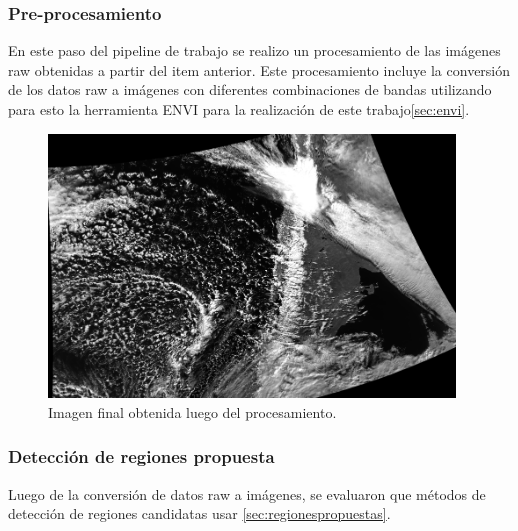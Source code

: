 \subsubsection*{Pre-procesamiento}
En este paso del pipeline de trabajo se realizo un procesamiento de las imágenes raw obtenidas a partir del item anterior. Este procesamiento incluye la conversión de los datos raw a imágenes con diferentes combinaciones de bandas utilizando para esto la herramienta ENVI para la realización de este trabajo\ref{sec:envi}.	

\begin{figure}[H] \centering
  \includegraphics[height=7cm,keepaspectratio=true,clip=true]{imagenes/tbd/pre-img.png}
  \caption{Imagen final obtenida luego del procesamiento.}\label{Fig:img-final}
\end{figure}

\subsubsection*{Detección de regiones propuesta}
Luego de la conversión de datos raw a imágenes, se evaluaron que métodos de detección de regiones candidatas usar \ref{sec:regionespropuestas}.

